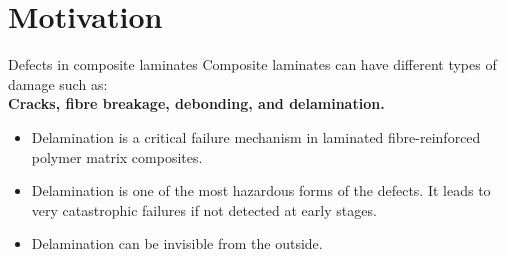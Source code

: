 \documentclass[10pt,aspectratio=169,dvipsnames]{beamer} %
\begin{document}
\section{Motivation}
\begin{frame}{Defects in composite laminates}
	\small
	Composite laminates can have different types of damage such as: \\
	\textbf{Cracks, fibre breakage, debonding, and \alert{delamination}.} \\ 
	\begin{minipage}[c]{0.45\textwidth}
		\begin{itemize}
			\footnotesize
			\item Delamination is a critical failure mechanism in laminated fibre-reinforced polymer matrix composites.
			\item Delamination is one of the most hazardous forms of the defects. 
			It leads to very catastrophic failures if not detected at early stages.
			\item Delamination can be invisible from the outside.
		\end{itemize}
	\end{minipage}
	\hfill
	\begin{minipage}[c]{0.45\textwidth}
		\begin{figure}
		\end{figure}
	\end{minipage}
\end{frame}
\end{document}
